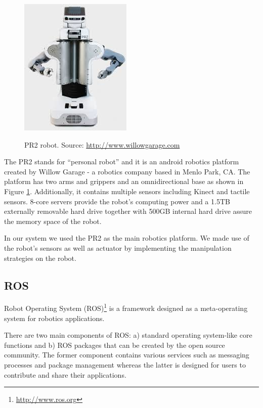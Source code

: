 \begin{figure}
\centering

{\includegraphics[width=0.5\columnwidth]{figures/pr2.jpeg}}

\caption{PR2 robot. Source: \url{http://www.willowgarage.com}}
\label{fig:pr2}
\end{figure}

The PR2 stands for ``personal robot'' and it is an android robotics platform created by Willow Garage - a robotics company based in Menlo Park, CA. The platform has two arms and grippers and an omnidirectional base as shown in Figure \ref{fig:pr2}. Additionally, it contains multiple sensors including Kinect and tactile sensors. 8-core servers provide the robot's computing power and a 1.5TB externally removable hard drive together with 500GB internal hard drive assure the memory space of the robot.  

In our system we used the PR2 as the main robotics platform. We made use of the robot's sensors as well as actuator by implementing the manipulation strategies on the robot.

\subsection{ROS}
Robot Operating System (ROS)\footnote{\url{http://www.ros.org}} is a framework designed as a meta-operating system for robotics applications. 

There are two main components of ROS: a) standard operating system-like core functions and b) ROS packages that can be created by the open source community. The former component contains various services such as messaging processes and package management whereas the latter is designed for users to contribute and share their applications. 


